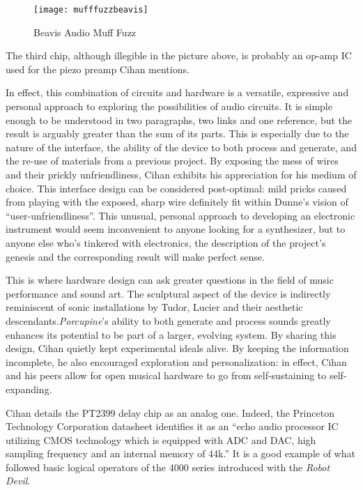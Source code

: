 	\begin{figure}[H]
	  \caption{Beavis Audio Muff Fuzz}
	  \centering
	    \texttt{[image: mufffuzzbeavis]}
	\end{figure}
	
The third chip, although illegible in the picture above, is probably an op-amp IC used for the piezo preamp Cihan mentions. 

In effect, this combination of circuits and hardware is a versatile, expressive and personal approach to exploring the possibilities of audio circuits. It is simple enough to be understood in two paragraphs, two links and one reference, but the result is arguably greater than the sum of its parts. This is especially due to the nature of the interface, the ability of the device to both process and generate, and the re-use of materials from a previous project. By exposing the mess of wires and their prickly unfriendliness, Cihan exhibits his appreciation for his medium of choice. This interface design can be considered post-optimal: mild pricks caused from playing with the exposed, sharp wire definitely fit within Dunne's vision of ``user-unfriendliness''. This unusual, personal approach to developing an electronic instrument would seem inconvenient to anyone looking for a synthesizer, but to anyone else who's tinkered with electronics, the description of the project's genesis and the corresponding result will make perfect sense. 

This is where hardware design can ask greater questions in the field of music performance and sound art. The sculptural aspect of the device is indirectly reminiscent of sonic installations by Tudor, Lucier and their aesthetic descendants.\emph{Porcupine}'s ability to both generate and process sounds greatly enhances its potential to be part of a larger, evolving system. By sharing this design, Cihan quietly kept experimental ideals alive. By keeping the information incomplete, he also encouraged exploration and personalization: in effect, Cihan and his peers allow for open musical hardware to go from self-sustaining to self-expanding. 

Cihan details the PT2399 delay chip as an analog one. Indeed, the Princeton Technology Corporation datasheet identifies it as an ``echo audio processor IC utilizing CMOS technology which is equipped with ADC and DAC, high sampling frequency and an internal memory of 44k.'' \citep{princetonpt} It is a good example of what followed basic logical operators of the 4000 series introduced with the \textit{Robot Devil}.

